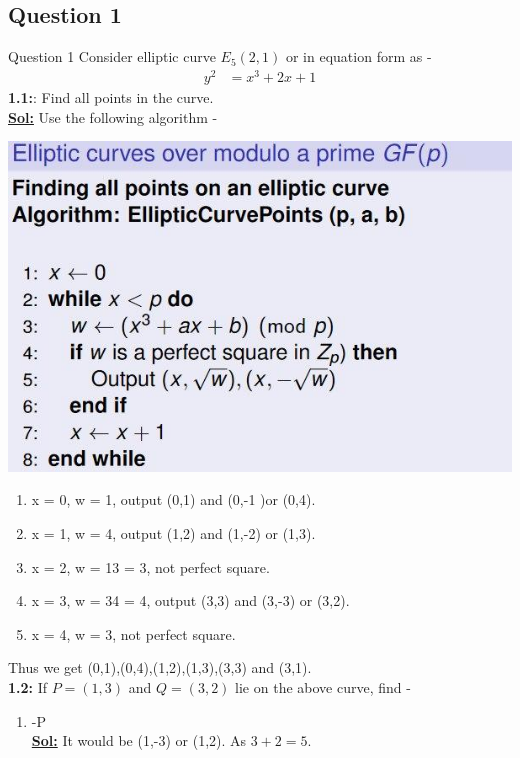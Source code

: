 \documentclass[xcolor=svgnames]{beamer}
\begin{document}
\subsection{Question 1}
\begin{frame}{Question 1}
    Consider elliptic curve $E_{5}(2,1)$ or in equation form as -
    \begin{align*}
        y^2 &= x^3 + 2x + 1
    \end{align*}
    \textbf{1.1:}: Find all points in the curve.
    \\ \textbf{\underline{Sol:}} Use the following algorithm - 
    \begin{center}
        \includegraphics[width=0.5\linewidth]{photo_2020-10-04_14-12-31.jpg}
    \end{center}
\end{frame}
\begin{frame}{}
    \begin{enumerate}
        \item x = 0, w = 1, output (0,1) and  (0,-1 )or (0,4). 
        \item x = 1, w = 4, output (1,2) and (1,-2) or (1,3).
        \item x = 2, w = 13 = 3, not perfect square. 
        \item x = 3, w = 34 = 4, output (3,3) and (3,-3) or (3,2).
        \item x = 4, w = 3, not perfect square.
    \end{enumerate}
    Thus we get (0,1),(0,4),(1,2),(1,3),(3,3) and (3,1).
    \vspace{1cm}
    \\ \textbf{1.2:} If $P=(1,3)$ and $Q = (3,2)$ lie on the above curve, find - 
    \begin{enumerate}
        \item -P
        \\ \textbf{\underline{Sol:}} It would be (1,-3) or (1,2). As $3 + 2 = 5$.
    \end{enumerate}    
\end{frame}
\end{document}
